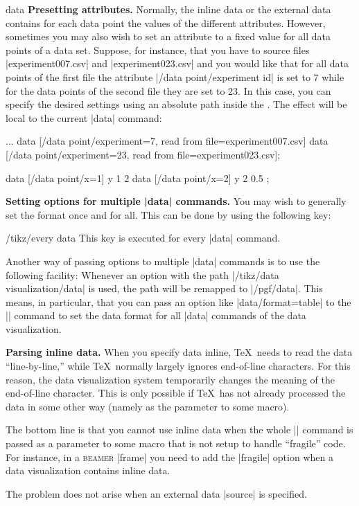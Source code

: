 \begin{datavisualizationoperation}{data}{}
  \medskip
  \textbf{Presetting attributes.}
  Normally, the inline data or the external data contains for each
  data point the values of the different attributes. However,
  sometimes you may also wish to set an attribute to a fixed value for
  all data points of a data set. Suppose, for instance, that you have
  to source files |experiment007.csv| and |experiment023.csv| and you
  would like that for all data points of the first file the attribute
  |/data point/experiment id| is set to 7 while for the data points of
  the second file they are set to 23. In this case, you can specify
  the desired settings using an absolute path inside the
  . The effect will be local to the current |data|
  command:
\begin{codeexample}
\datavisualization...
  data [/data point/experiment=7,  read from file=experiment007.csv]
  data [/data point/experiment=23, read from file=experiment023.csv];
\end{codeexample}

\begin{codeexample}[]
\tikz
    data [/data point/x=1] {
      y
      1
      2
    }
    data [/data point/x=2] {
      y
      2
      0.5
    };
\end{codeexample}

  \medskip
  \textbf{Setting options for multiple |data| commands.}
  You may wish to generally set the format once and for all. This can
  be done by using the following key:
  \begin{stylekey}{/tikz/every data}
    This key is executed for every |data| command.
  \end{stylekey}

  Another way of passing options to multiple |data| commands is to use
  the following facility: Whenever an option with the path
  |/tikz/data visualization/data| is used, the path will be remapped
  to  |/pgf/data|. This means, in particular, that you can pass an
  option like |data/format=table| to the |\datavisualization| command
  to set the data format for all |data| commands of the data
  visualization.

  \medskip
  \textbf{Parsing inline data.}
  When you specify data inline, \TeX\ needs to read the data
  ``line-by-line,'' while \TeX\ normally largely ignores end-of-line
  characters. For this reason, the data visualization system
  temporarily changes the meaning of the end-of-line character. This
  is only possible if \TeX\ has not already processed the data in some
  other way (namely as the parameter to some macro).

  The bottom line is that you cannot use inline data when the whole
  |\datavisualization| command is passed as a parameter to some
  macro that is not setup to handle ``fragile'' code. For instance, in
  a \textsc{beamer} |frame| you need to add the |fragile| option when
  a data visualization contains inline data.

  The problem does not arise when an external data |source| is
  specified.
\end{datavisualizationoperation}


